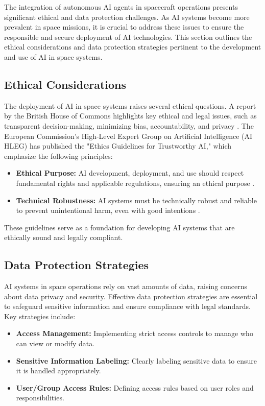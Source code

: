 \documentclass[a4paper,12pt]{article}
\begin{document}
The integration of autonomous AI agents in spacecraft operations presents significant ethical and data protection challenges. As AI systems become more prevalent in space missions, it is crucial to address these issues to ensure the responsible and secure deployment of AI technologies. This section outlines the ethical considerations and data protection strategies pertinent to the development and use of AI in space systems.

\subsection{Ethical Considerations}

The deployment of AI in space systems raises several ethical questions. A report by the British House of Commons highlights key ethical and legal issues, such as transparent decision-making, minimizing bias, accountability, and privacy \cite{british_commons_report}. The European Commission's High-Level Expert Group on Artificial Intelligence (AI HLEG) has published the "Ethics Guidelines for Trustworthy AI," which emphasize the following principles:

\begin{itemize}
    \item \textbf{Ethical Purpose:} AI development, deployment, and use should respect fundamental rights and applicable regulations, ensuring an ethical purpose \cite{ai_hleg_guidelines}.
    \item \textbf{Technical Robustness:} AI systems must be technically robust and reliable to prevent unintentional harm, even with good intentions \cite{ai_hleg_guidelines}.
\end{itemize}

These guidelines serve as a foundation for developing AI systems that are ethically sound and legally compliant.

\subsection{Data Protection Strategies}

AI systems in space operations rely on vast amounts of data, raising concerns about data privacy and security. Effective data protection strategies are essential to safeguard sensitive information and ensure compliance with legal standards. Key strategies include:

\begin{itemize}
    \item \textbf{Access Management:} Implementing strict access controls to manage who can view or modify data.
    \item \textbf{Sensitive Information Labeling:} Clearly labeling sensitive data to ensure it is handled appropriately.
    \item \textbf{User/Group Access Rules:} Defining access rules based on user roles and responsibilities.
\end{itemize}
\end{document}
